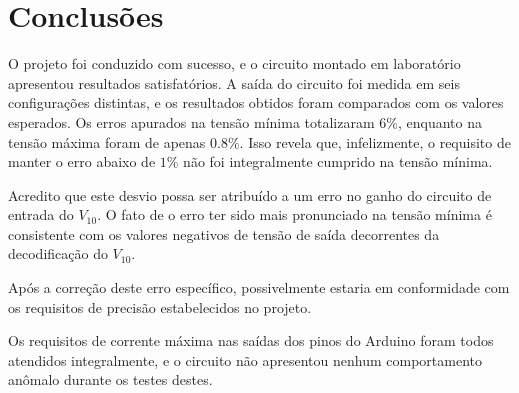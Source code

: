 \section{Conclusões}

O projeto foi conduzido com sucesso, e o circuito montado em laboratório apresentou resultados satisfatórios. A saída do circuito foi medida em seis configurações distintas, e os resultados obtidos foram comparados com os valores esperados. Os erros apurados na tensão mínima totalizaram $6\%$, enquanto na tensão máxima foram de apenas $0.8\%$. Isso revela que, infelizmente, o requisito de manter o erro abaixo de $1\%$ não foi integralmente cumprido na tensão mínima.

Acredito que este desvio possa ser atribuído a um erro no ganho do circuito de entrada do $V_{10}$. O fato de o erro ter sido mais pronunciado na tensão mínima é consistente com os valores negativos de tensão de saída decorrentes da decodificação do $V_{10}$.

Após a correção deste erro específico, possivelmente estaria em conformidade com os requisitos de precisão estabelecidos no projeto.

Os requisitos de corrente máxima nas saídas dos pinos do Arduino foram todos atendidos integralmente, e o circuito não apresentou nenhum comportamento anômalo durante os testes destes.